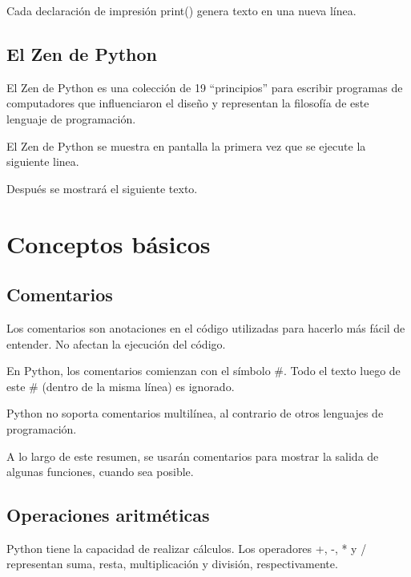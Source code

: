 \documentclass{report}
\newcommand{\doble}[1]{``#1''}
\begin{document}

Cada declaración de impresión print() genera texto en una nueva línea.


\section{El Zen de Python}

El Zen de Python es una colección de 19 \doble{principios} para escribir programas de computadores que influenciaron el diseño y representan la filosofía de este lenguaje de programación.

El Zen de Python se muestra en pantalla la primera vez que se ejecute la siguiente linea.


Después se mostrará el siguiente texto.


\clearpage\chapter{Conceptos básicos}

\section{Comentarios}

Los comentarios son anotaciones en el código utilizadas para hacerlo más fácil de entender. No afectan la ejecución del código.

En Python, los comentarios comienzan con el símbolo \#. Todo el texto luego de este \# (dentro de la misma línea) es ignorado.


Python no soporta comentarios multilínea, al contrario de otros lenguajes de programación.

A lo largo de este resumen, se usarán comentarios para mostrar la salida de algunas funciones, cuando sea posible.

\section{Operaciones aritméticas}

Python tiene la capacidad de realizar cálculos. Los operadores +, -, * y / representan suma, resta, multiplicación y división, respectivamente.
\end{document}
